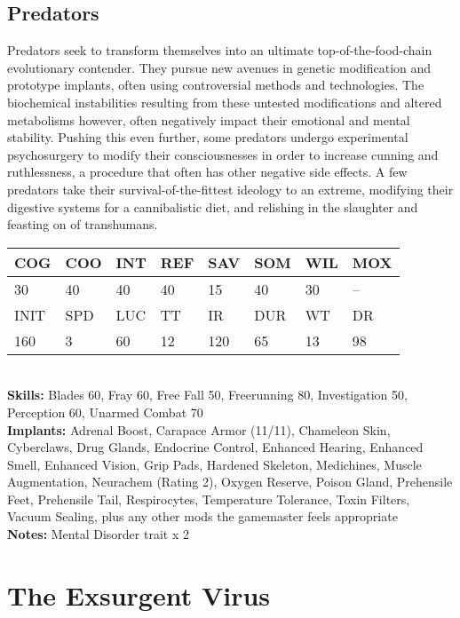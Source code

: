 \subsection{Predators} 

Predators seek to transform themselves into an ultimate top-of-the-food-chain evolutionary contender. They pursue new avenues in genetic modification and prototype implants, often using controversial methods and technologies. The biochemical instabilities resulting from these untested modifications and altered metabolisms however, often negatively impact their emotional and mental stability. Pushing this even further, some predators undergo experimental psychosurgery to modify their consciousnesses in order to increase cunning and ruthlessness, a procedure that often has other negative side effects. A few predators take their survival-of-the-fittest ideology to an extreme, modifying their digestive systems for a cannibalistic diet, and relishing in the slaughter and feasting on of transhumans. 

\begin{tabular}{|l|l|l|l|l|l|l|l|} \hline

COG &COO &INT &REF &SAV &SOM &WIL &MOX \\ \hline

30 &40 &40 &40 &15 &40 &30 &-- \\ \hline

INIT &SPD &LUC &TT &IR &DUR &WT &DR \\ \hline

160 &3 &60 &12 &120 &65 &13 &98 \\ \hline

\end{tabular} \\ \textbf{Skills:} Blades 60, Fray 60, Free Fall 50, Freerunning 80, Investigation 50, Perception 60, Unarmed Combat 70 \\ \textbf{Implants:} Adrenal Boost, Carapace Armor (11/11), Chameleon Skin, Cyberclaws, Drug Glands, Endocrine Control, Enhanced Hearing, Enhanced Smell, Enhanced Vision, Grip Pads, Hardened Skeleton, Medichines, Muscle Augmentation, Neurachem (Rating 2), Oxygen Reserve, Poison Gland, Prehensile Feet, Prehensile Tail, Respirocytes, Temperature Tolerance, Toxin Filters, Vacuum Sealing, plus any other mods the gamemaster feels appropriate \\ \textbf{Notes:} Mental Disorder trait x 2 

\section{The Exsurgent Virus } 

